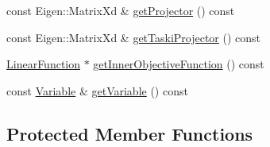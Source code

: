 \begin{DoxyCompactItemize}
\item 
const Eigen\+::\+Matrix\+Xd \& \hyperlink{classgocra_1_1GHCJTTask_a666a371b1f2d20dcfd7d85a131c2c2df}{get\+Projector} () const
\item 
const Eigen\+::\+Matrix\+Xd \& \hyperlink{classgocra_1_1GHCJTTask_afb71d62a6e57292529af427c09f92465}{get\+Taski\+Projector} () const
\item 
\hyperlink{classocra_1_1LinearFunction}{Linear\+Function} $\ast$ \hyperlink{classgocra_1_1GHCJTTask_af38e11377a98b3adcdb9b4e47d55fae0}{get\+Inner\+Objective\+Function} () const
\item 
const \hyperlink{classocra_1_1Variable}{Variable} \& \hyperlink{classgocra_1_1GHCJTTask_a9ba33bc965fe2d39a7758bca2d41005a}{get\+Variable} () const
\end{DoxyCompactItemize}
\subsection*{Protected Member Functions}
